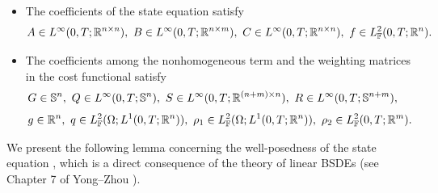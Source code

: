 \documentclass[11pt,times,twoside]{article}
\def\dbF{\mathbb{F}} \def\sF{\mathscr{F}} \def\fF{\mathfrak{F}} \def\cF{{\cal F}} \def\BF{{\bf F}} \def\Bf{{\bf f}}
\def\dbR{\mathbb{R}} \def\sR{\mathscr{R}} \def\fR{\mathfrak{R}} \def\cR{{\cal R}} \def\BR{{\bf R}} \def\Br{{\bf r}}
\def\dbS{\mathbb{S}} \def\sS{\mathscr{S}} \def\fS{\mathfrak{S}} \def\cS{{\cal S}} \def\BS{{\bf S}} \def\Bs{{\bf s}}
\def\Om{\Omega}      \def\Lm{\Lambda}     \def\Th{\Theta}
\def\nn{\nonumber}        \def\La{\mathop{\Leftarrow}}       \def\ran{\rangle}
\def\ts{\times}           \def\qq{\qquad}                    \def\rran{\right\rangle}
\begin{document}
%
\begin{itemize}
  \item [\bf{(A1)}] The coefficients of the state equation  satisfy
      $$A\in L^{\i}(0,T;\dbR^{n\ts n}),\ B\in L^{\i}(0,T;\dbR^{n\ts m}),\
       C\in L^{\i}(0,T;\dbR^{n\ts n}),\ f\in L^2_{\dbF}(0,T;\dbR^n).$$
  \item [\bf{(A2)}]  The coefficients among the nonhomogeneous term and the weighting matrices in the cost functional  satisfy
\begin{align*}
\ds       &G\in\dbS^n,\ Q\in L^{\i}(0,T;\dbS^n),\ S\in L^{\i}(0,T;\dbR^{(n+m)\ts n}),\
      R\in L^{\i}(0,T;\dbS^{n+m}), \nn \\
\ns\ds     & g\in \dbR^n,\ q\in L^2_{\dbF}(\Om;L^1(0,T;\dbR^n)),\ \rho_1\in L^2_{\dbF}(\Om;L^1(0,T;\dbR^n)),\
      \rho_2\in  L^2_{\dbF}(0,T;\dbR^m). \nn
\end{align*}
\end{itemize}
%
We present the following lemma concerning the well-posedness of the state equation ,
which is a direct consequence of the theory of linear BSDEs (see Chapter 7 of Yong--Zhou \cite{Yong-Zhou1999}).
\end{document}
